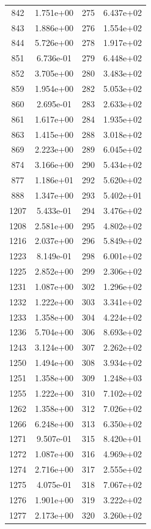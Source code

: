 \documentclass[12pt]{article}
\begin{document}
\begin{longtable}{@{}cccc@{}}
842 & 1.751e+00 & 275 & 6.437e+02 \\
843 & 1.886e+00 & 276 & 1.554e+02 \\
844 & 5.726e+00 & 278 & 1.917e+02 \\
851 & 6.736e-01 & 279 & 6.448e+02 \\
852 & 3.705e+00 & 280 & 3.483e+02 \\
859 & 1.954e+00 & 282 & 5.053e+02 \\
860 & 2.695e-01 & 283 & 2.633e+02 \\
861 & 1.617e+00 & 284 & 1.935e+02 \\
863 & 1.415e+00 & 288 & 3.018e+02 \\
869 & 2.223e+00 & 289 & 6.045e+02 \\
874 & 3.166e+00 & 290 & 5.434e+02 \\
877 & 1.186e+01 & 292 & 5.620e+02 \\
888 & 1.347e+00 & 293 & 5.402e+01 \\
1207 & 5.433e-01 & 294 & 3.476e+02 \\
1208 & 2.581e+00 & 295 & 4.802e+02 \\
1216 & 2.037e+00 & 296 & 5.849e+02 \\
1223 & 8.149e-01 & 298 & 6.001e+02 \\
1225 & 2.852e+00 & 299 & 2.306e+02 \\
1231 & 1.087e+00 & 302 & 1.296e+02 \\
1232 & 1.222e+00 & 303 & 3.341e+02 \\
1233 & 1.358e+00 & 304 & 4.224e+02 \\
1236 & 5.704e+00 & 306 & 8.693e+02 \\
1243 & 3.124e+00 & 307 & 2.262e+02 \\
1250 & 1.494e+00 & 308 & 3.934e+02 \\
1251 & 1.358e+00 & 309 & 1.248e+03 \\
1255 & 1.222e+00 & 310 & 7.102e+02 \\
1262 & 1.358e+00 & 312 & 7.026e+02 \\
1266 & 6.248e+00 & 313 & 6.350e+02 \\
1271 & 9.507e-01 & 315 & 8.420e+01 \\
1272 & 1.087e+00 & 316 & 4.969e+02 \\
1274 & 2.716e+00 & 317 & 2.555e+02 \\
1275 & 4.075e-01 & 318 & 7.067e+02 \\
1276 & 1.901e+00 & 319 & 3.222e+02 \\
1277 & 2.173e+00 & 320 & 3.260e+02 \\

\end{longtable}
\end{document}
